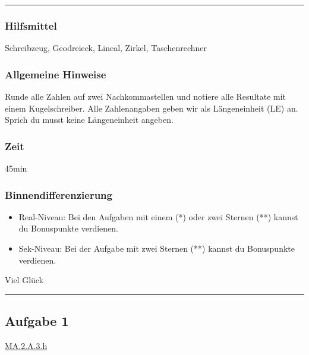 \documentclass[
  letterpaper,
  DIV=11]{scrartcl}
\providecommand{\tightlist}{%
  \setlength{\itemsep}{0pt}\setlength{\parskip}{0pt}}\usepackage{longtable,booktabs,array}
\begin{document}
\begin{center}\rule{0.5\linewidth}{0.5pt}\end{center}

\subsubsection{Hilfsmittel}\label{hilfsmittel}

Schreibzeug, Geodreieck, Lineal, Zirkel, Taschenrechner

\subsubsection{Allgemeine Hinweise}\label{allgemeine-hinweise}

Runde alle Zahlen auf zwei Nachkommastellen und notiere alle Resultate
mit einem Kugelschreiber. Alle Zahlenangaben geben wir als Längeneinheit
(LE) an. Sprich du musst keine Längeneinheit angeben.

\subsubsection{Zeit}\label{zeit}

45min

\subsubsection{Binnendifferenzierung}\label{binnendifferenzierung}

\begin{itemize}
\tightlist
\item
  Real-Niveau: Bei den Aufgaben mit einem (*) oder zwei Sternen (**)
  kannst du Bonuspunkte verdienen.
\item
  Sek-Niveau: Bei der Aufgabe mit zwei Sternen (**) kannst du
  Bonuspunkte verdienen.
\end{itemize}

Viel Glück

\begin{center}\rule{0.5\linewidth}{0.5pt}\end{center}

\subsection{Aufgabe 1}\label{aufgabe-1}

\href{https://be.lehrplan.ch/101PkqMkqzxUs36hHHkYEzbSuMg99acT6}{MA.2.A.3.h}
\end{document}
